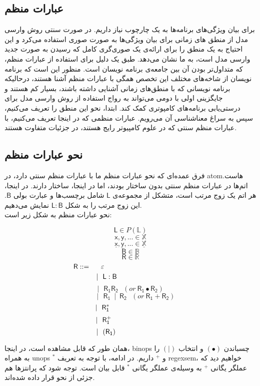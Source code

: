 \subsection{عبارات منظم}
برای بیان ویژگی‌های برنامه‌ها به یک چارچوب نیاز داریم. در صورت سنتی روش وارسی مدل از منطق های زمانی برای بیان ویژگی‌ها به صورت صوری استفاده می‌کرد و این احتیاج به یک منطق را برای ارائه‌ی یک صوری‌گری کامل که رسیدن به صورت جدید وارسی مدل است، به ما نشان می‌دهد. طبق \cite{calcul} یک دلیل برای استفاده از عبارات منظم، که متداول‌تر بودن آن بین جامعه‌ی برنامه نویسان است. منظور این است که برنامه نویسان از شاخه‌های مختلف این تخصص همگی با عبارات منظم آشنا هستند، درحالیکه برنامه نویسانی که با منطق‌های زمانی آشنایی داشته باشند، بسیار کم هستند و جایگزینی اولی با دومی می‌تواند به رواج استفاده از روش وارسی مدل برای درستی‌یابی برنامه‌های کامپوتری کمک کند. ابتدا، نحو این منطق را تعریف می‌کنیم، سپس به سراغ معناشناسی آن می‌رویم. عبارات منظمی که در اینجا تعریف می‌کنیم، با عبارات منظم سنتی که در علوم کامپیوتر رایج هستند، در جزئیات متفاوت هستند. 
\subsection{نحو عبارات منظم}
فرق عمده‌ای که نحو عبارات منظم ما با عبارات منظم سنتی دارد، در \gls{atom}هاست. اتم‌ها در عبارات منظم سنتی بدون ساختار بودند، اما در اینجا، ساختار دارند. در اینجا، هر اتم یک زوج مرتب است، متشکل از مجموعه‌ی $\mathsf{L}$ شامل برچسب‌ها و عبارت بولی $\mathsf{B}$. این زوج مرتب را به شکل 
$\mathsf{L : B}$
نمایش می‌دهیم.\\ 
نحو عبارات منظم به شکل زیر است:
\begin{defn}
$$\mathsf{L} \in \mathit{P}(\mathbb{L})$$        
$$\mathsf{x,y,...} \in \mathbb{X}$$
$$\mathsf{\underline{x},\underline{y},...} \in \mathbb{\underline{X}}$$
$$\mathsf{B} \in \mathbb{B}$$
$$\mathsf{R} \in \mathbb{R}$$
$$\mathsf{R} ::=\hspace{0.5cm} \varepsilon\hspace{4.2cm}$$
$$|\:\:\:\mathsf{L : B}\hspace{2.4cm}$$
$$|\:\:\:\mathsf{R_1 R_2}\:\:\:(or\:\mathsf{R_1 \bullet R_2 })$$
$$\:\:\:\:\:\:\:|\:\:\:\mathsf{R_1\:\mid\:R_2}\:\:\:(or\:\mathsf{R_1 + R_2 })$$
$$|\:\:\:\mathsf{R_1^*}\hspace{2.8cm}$$
$$|\:\:\:\mathsf{R_1^+}\hspace{2.7cm}$$
$$|\:\:\:(\mathsf{R_1})\hspace{2.47cm}$$
\end{defn}
همان طور که قابل مشاهده است، در اینجا، \glspl*{binop} چسباندن
$(\bullet)$
 و انتخاب
$(|)$
 را به همراه \glspl*{unop}
$^*$
و
$^+$
داریم.
در ادامه، با توجه به تعریف \gls{regexsem}، خواهیم دید که عملگر یگانی 
$^+$
به وسیله‌ی عملگر یگانی $^*$ قابل بیان است.
توجه شود که پرانتزها هم جزئی از نحو قرار داده شده‌اند.


